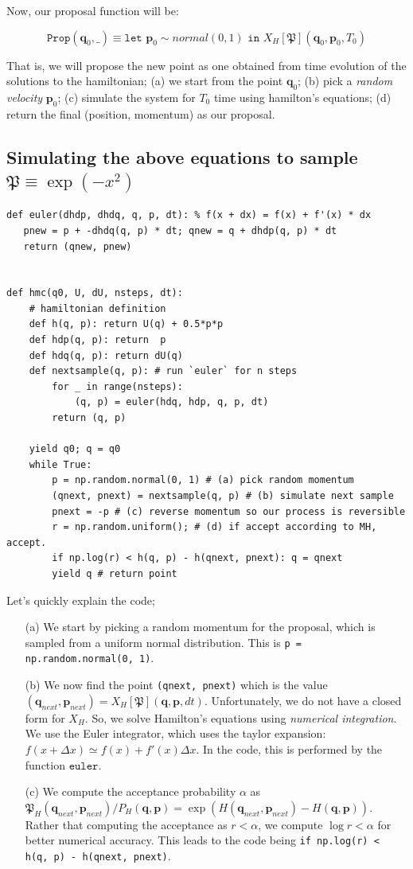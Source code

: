 \documentclass[titlepage]{article}
\newcommand{\p}{\mathbf{p}}
\newcommand{\q}{\mathbf{q}}
\renewcommand{\P}{\mathfrak{P}}
\newcommand{\Prop}{\texttt{Prop}}
\begin{document}
Now, our proposal function will be:

$$
\Prop(\q_0, \_) \equiv \texttt{let } \p_0 \sim normal(0, 1) \texttt{ in }  X_H[\P](\q_0, \p_0, T_0)
$$

That is, we will  propose the new point as one obtained
from time evolution of the solutions to the hamiltonian; (a) we start from the
point $\q_0$; (b) pick a \emph{random velocity} $\p_0$; (c) simulate the
system for $T_0$ time using hamilton's equations; (d) return the final (position, momentum) as our proposal.

\subsection{Simulating the above equations to sample $\P \equiv \exp(-x^2)$}

\begin{verbatim}
def euler(dhdp, dhdq, q, p, dt): % f(x + dx) = f(x) + f'(x) * dx
   pnew = p + -dhdq(q, p) * dt; qnew = q + dhdp(q, p) * dt
   return (qnew, pnew)


def hmc(q0, U, dU, nsteps, dt):
    # hamiltonian definition
    def h(q, p): return U(q) + 0.5*p*p
    def hdp(q, p): return  p
    def hdq(q, p): return dU(q)
    def nextsample(q, p): # run `euler` for n steps
        for _ in range(nsteps):
            (q, p) = euler(hdq, hdp, q, p, dt)
        return (q, p)

    yield q0; q = q0
    while True:
        p = np.random.normal(0, 1) # (a) pick random momentum
        (qnext, pnext) = nextsample(q, p) # (b) simulate next sample
        pnext = -p # (c) reverse momentum so our process is reversible
        r = np.random.uniform(); # (d) if accept according to MH, accept.
        if np.log(r) < h(q, p) - h(qnext, pnext): q = qnext
        yield q # return point
\end{verbatim}
Let's quickly explain the code;
\begin{itemize}
    \item[(a)] We start by picking a random momentum for the proposal,
               which is sampled from a uniform normal distribution.
               This is \texttt{p = np.random.normal(0, 1)}.
    \item[(b)] We now find the point \texttt{(qnext, pnext)} which is
        the value $(\q_{next}, \p_{next}) = X_H[\P](\q, \p, dt)$. Unfortunately,
        we do not have a closed form for $X_H$. So, we solve Hamilton's
        equations using \emph{numerical  integration}.
        We use the Euler integrator, which uses the taylor expansion:
        $f(x+\Delta x) \simeq f(x) + f'(x) \Delta x$.  In the code, this is
        performed by the function $\texttt{euler}$. 
    \item[(c)] We compute the acceptance probability $\alpha$ as $\P_H(\q_{next}, \p_{next})/P_H(\q, \p) = \exp(H(\q_{next}, \p_{next}) - H(\q, \p))$.
        Rather that computing the acceptance as $r < \alpha$, we compute
        $\log r < \alpha$ for better numerical accuracy. This leads
        to the code being \texttt{if np.log(r) < h(q, p) - h(qnext, pnext)}.
\end{itemize}
\end{document}
